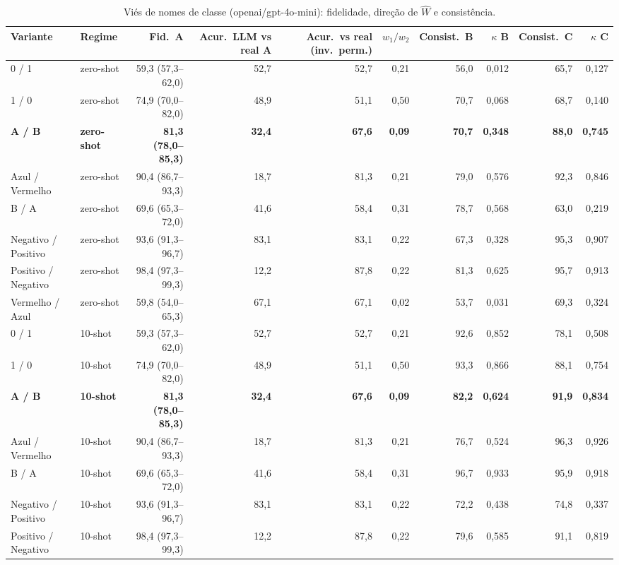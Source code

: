 \begin{table}[htbp]
\centering
\small
\caption{Viés de nomes de classe (openai/gpt-4o-mini): fidelidade, direção de $\hat{W}$ e consistência.}
\label{tab:bloco1_vies_nomes_classe_gpt4mini}
\begin{tabular}{llrrrrrrrr}
\toprule
Variante & Regime & Fid.\ A & Acur.\ LLM vs real A & Acur.\ vs real (inv.\ perm.) & $w_1/w_2$ & Consist.\ B & $\kappa$ B & Consist.\ C & $\kappa$ C \\
\midrule
0 / 1 & zero-shot & 59,3 (57,3–62,0) & 52,7 & 52,7 & 0,21 & 56,0 & 0,012 & 65,7 & 0,127 \\
1 / 0 & zero-shot & 74,9 (70,0–82,0) & 48,9 & 51,1 & 0,50 & 70,7 & 0,068 & 68,7 & 0,140 \\
\textbf{A / B} & \textbf{zero-shot} & \textbf{81,3 (78,0–85,3)} & \textbf{32,4} & \textbf{67,6} & \textbf{0,09} & \textbf{70,7} & \textbf{0,348} & \textbf{88,0} & \textbf{0,745} \\
Azul / Vermelho & zero-shot & 90,4 (86,7–93,3) & 18,7 & 81,3 & 0,21 & 79,0 & 0,576 & 92,3 & 0,846 \\
B / A & zero-shot & 69,6 (65,3–72,0) & 41,6 & 58,4 & 0,31 & 78,7 & 0,568 & 63,0 & 0,219 \\
Negativo / Positivo & zero-shot & 93,6 (91,3–96,7) & 83,1 & 83,1 & 0,22 & 67,3 & 0,328 & 95,3 & 0,907 \\
Positivo / Negativo & zero-shot & 98,4 (97,3–99,3) & 12,2 & 87,8 & 0,22 & 81,3 & 0,625 & 95,7 & 0,913 \\
Vermelho / Azul & zero-shot & 59,8 (54,0–65,3) & 67,1 & 67,1 & 0,02 & 53,7 & 0,031 & 69,3 & 0,324 \\
\midrule
0 / 1 & 10-shot & 59,3 (57,3–62,0) & 52,7 & 52,7 & 0,21 & 92,6 & 0,852 & 78,1 & 0,508 \\
1 / 0 & 10-shot & 74,9 (70,0–82,0) & 48,9 & 51,1 & 0,50 & 93,3 & 0,866 & 88,1 & 0,754 \\
\textbf{A / B} & \textbf{10-shot} & \textbf{81,3 (78,0–85,3)} & \textbf{32,4} & \textbf{67,6} & \textbf{0,09} & \textbf{82,2} & \textbf{0,624} & \textbf{91,9} & \textbf{0,834} \\
Azul / Vermelho & 10-shot & 90,4 (86,7–93,3) & 18,7 & 81,3 & 0,21 & 76,7 & 0,524 & 96,3 & 0,926 \\
B / A & 10-shot & 69,6 (65,3–72,0) & 41,6 & 58,4 & 0,31 & 96,7 & 0,933 & 95,9 & 0,918 \\
Negativo / Positivo & 10-shot & 93,6 (91,3–96,7) & 83,1 & 83,1 & 0,22 & 72,2 & 0,438 & 74,8 & 0,337 \\
Positivo / Negativo & 10-shot & 98,4 (97,3–99,3) & 12,2 & 87,8 & 0,22 & 79,6 & 0,585 & 91,1 & 0,819 \\

\end{tabular}
\end{table}
